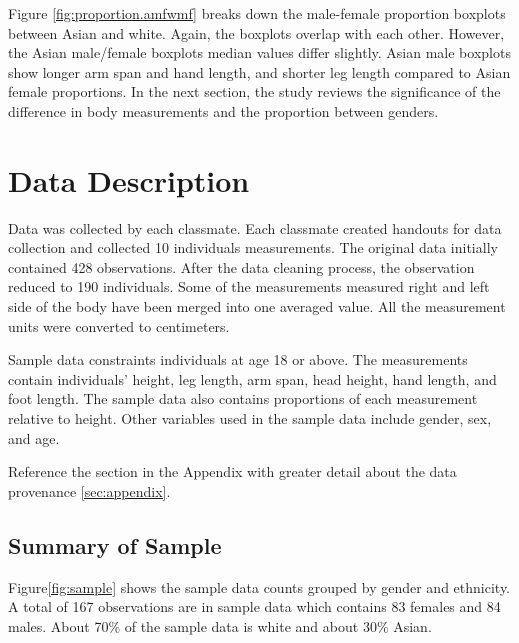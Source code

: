 \documentclass[]{article}
\begin{document}
\noindent Figure \ref{fig:proportion.amfwmf} breaks down the male-female
proportion boxplots between Asian and white. Again, the boxplots overlap
with each other. However, the Asian male/female boxplots median values
differ slightly. Asian male boxplots show longer arm span and hand
length, and shorter leg length compared to Asian female proportions. In
the next section, the study reviews the significance of the difference
in body measurements and the proportion between genders.\vspace{0.25in}

\section{Data Description}
\label{sec:data}

\noindent Data was collected by each classmate. Each classmate created
handouts for data collection and collected 10 individuals measurements.
The original data initially contained 428 observations. After the data
cleaning process, the observation reduced to 190 individuals. Some of
the measurements measured right and left side of the body have been
merged into one averaged value. All the measurement units were converted
to centimeters.\vspace{0.25in}

\noindent Sample data constraints individuals at age 18 or above. The
measurements contain individuals' height, leg length, arm span, head
height, hand length, and foot length. The sample data also contains
proportions of each measurement relative to height. Other variables used
in the sample data include gender, sex, and age.\vspace{0.25in}

\noindent Reference the section in the Appendix with greater detail
about the data provenance \ref{sec:appendix}.

\subsection{Summary of Sample}
\label{sec:data-sample}

\noindent Figure\ref{fig:sample} shows the sample data counts grouped by
gender and ethnicity. A total of 167 observations are in sample data
which contains 83 females and 84 males. About 70\% of the sample data is
white and about 30\% Asian.
\end{document}
